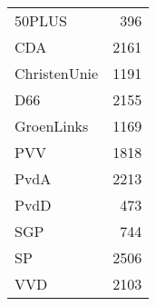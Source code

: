 \begin{tabular}{lr}
\toprule
50PLUS       &   396 \\
CDA          &  2161 \\
ChristenUnie &  1191 \\
D66          &  2155 \\
GroenLinks   &  1169 \\
PVV          &  1818 \\
PvdA         &  2213 \\
PvdD         &   473 \\
SGP          &   744 \\
SP           &  2506 \\
VVD          &  2103 \\
\bottomrule
\end{tabular}
